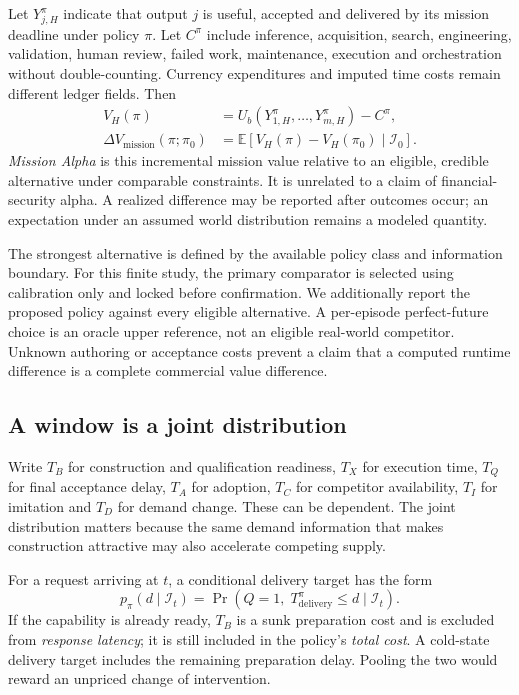 \documentclass[11pt,a4paper]{article}
\newcommand{\MA}{\ensuremath{\Delta V_{\mathrm{mission}}}}
\begin{document}
Let $Y^\pi_{j,H}$ indicate that output $j$ is useful, accepted and delivered by its mission deadline under policy $\pi$. Let $C^\pi$ include inference, acquisition, search, engineering, validation, human review, failed work, maintenance, execution and orchestration without double-counting. Currency expenditures and imputed time costs remain different ledger fields. Then
\begin{align}
V_H(\pi)&=U_b(Y^\pi_{1,H},\ldots,Y^\pi_{m,H})-C^\pi,\\
\MA(\pi;\pi_0)&=\mathbb E[V_H(\pi)-V_H(\pi_0)\mid\mathcal I_0].
\end{align}
\emph{Mission Alpha} is this incremental mission value relative to an eligible, credible alternative under comparable constraints. It is unrelated to a claim of financial-security alpha. A realized difference may be reported after outcomes occur; an expectation under an assumed world distribution remains a modeled quantity.

The strongest alternative is defined by the available policy class and information boundary. For this finite study, the primary comparator is selected using calibration only and locked before confirmation. We additionally report the proposed policy against every eligible alternative. A per-episode perfect-future choice is an oracle upper reference, not an eligible real-world competitor. Unknown authoring or acceptance costs prevent a claim that a computed runtime difference is a complete commercial value difference.

\subsection{A window is a joint distribution}
Write $T_B$ for construction and qualification readiness, $T_X$ for execution time, $T_Q$ for final acceptance delay, $T_A$ for adoption, $T_C$ for competitor availability, $T_I$ for imitation and $T_D$ for demand change. These can be dependent. The joint distribution matters because the same demand information that makes construction attractive may also accelerate competing supply.

For a request arriving at $t$, a conditional delivery target has the form
\begin{equation}
p_\pi(d\mid\mathcal I_t)=\Pr\!\left(Q=1,\;T^\pi_{\mathrm{delivery}}\leq d\mid\mathcal I_t\right).
\end{equation}
If the capability is already ready, $T_B$ is a sunk preparation cost and is excluded from \emph{response latency}; it is still included in the policy's \emph{total cost}. A cold-state delivery target includes the remaining preparation delay. Pooling the two would reward an unpriced change of intervention.
\end{document}
